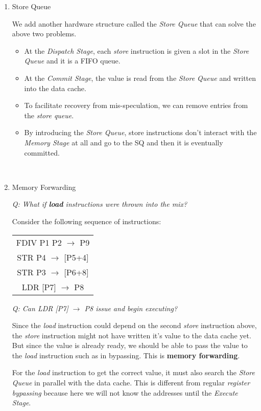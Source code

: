 \documentclass[12pt]{article}
\newenvironment{QandA}{\begin{enumerate}[label=\bfseries\arabic*.]\bfseries}
                      {\end{enumerate}}
\newenvironment{answered}{\par\quad\normalfont}{}
\begin{document}
\begin{QandA}
\ 

\item Store Queue
\begin{answered}
We add another hardware structure called the \textit{Store Queue} that can solve the above two problems.
\begin{itemize}
    \item At the \textit{Dispatch Stage}, each \textit{store} instruction is given a slot in the \textit{Store Queue} and it is a FIFO queue.
    \item At the \textit{Commit Stage}, the value is read from the \textit{Store Queue} and written into the data cache.
    \item To facilitate recovery from mis-speculation, we can remove entries from the \textit{store queue}. 
    \item By introducing the \textit{Store Queue}, store instructions don't interact with the \textit{Memory Stage} at all and go to the SQ and then it is eventually committed.
\end{itemize}
\end{answered}

\ 

\item Memory Forwarding
\begin{answered}
\textit{Q: What if \textbf{load} instructions were thrown into the mix?}

Consider the following sequence of instructions:
\begin{center}
\begin{tabular}{ |c| } 
 \hline
 FDIV P1 \/ P2 $\rightarrow$ P9 \\ 
 STR P4 $\rightarrow$ [P5+4] \\
 STR P3 $\rightarrow$ [P6+8] \\
 LDR [P7] $\rightarrow$ P8 \\
 \hline
\end{tabular}
\end{center}

\textit{Q: Can LDR [P7] $\rightarrow$ P8 issue and begin executing?}

\quad Since the \textit{load} instruction could depend on the second \textit{store} instruction above, the \textit{store} instruction might not have written it's value to the data cache yet. But since the value is already ready, we should be able to pass the value to the \textit{load} instruction such as in bypassing. This is \textbf{memory forwarding}.

For the \textit{load} instruction to get the correct value, it must also search the \textit{Store Queue} in parallel with the data cache. This is different from regular \textit{register bypassing} because here we will not know the addresses until the \textit{Execute Stage}. 
\end{answered}


\end{QandA}
\end{document}
